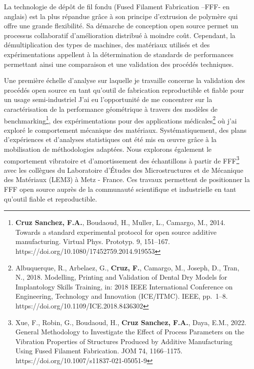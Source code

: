 \documentclass[
  11pt,
]{article}
\begin{document}
La technologie de dépôt de fil fondu (Fused Filament Fabrication --FFF-
en anglais) est la plus répandue grâce à son principe d'extrusion de
polymère qui offre une grande flexibilité. Sa démarche de conception
open source permet un processus collaboratif d'amélioration distribué à
moindre coût. Cependant, la démultiplication des types de machines, des
matériaux utilisés et des expérimentations appellent à la détermination
de standards de performances permettant ainsi une comparaison et une
validation des procédés techniques.

Une première échelle d'analyse sur laquelle je travaille concerne la
validation des procédés open source en tant qu'outil de fabrication
reproductible et fiable pour un usage semi-industriel J'ai eu
l'opportunité de me concentrer sur la caractérisation de la performance
géométrique à travers des modèles de benchmarking\footnote{\textbf{Cruz
  Sanchez, F.A.}, Boudaoud, H., Muller, L., Camargo, M., 2014. Towards a
  standard experimental protocol for open source additive manufacturing.
  Virtual Phys. Prototyp. 9, 151--167.
  https://doi.org/10.1080/17452759.2014.919553}, des expérimentations
pour des applications médicales\footnote{Albuquerque, R., Arbelaez, G.,
  \textbf{Cruz, F.}, Camargo, M., Joseph, D., Tran, N., 2018. Modelling,
  Printing and Validation of Dental Dry Models for Implantology Skills
  Training, in: 2018 IEEE International Conference on Engineering,
  Technology and Innovation (ICE/ITMC). IEEE, pp.~1--8.
  https://doi.org/10.1109/ICE.2018.8436302} où j'ai exploré le
comportement mécanique des matériaux. Systématiquement, des plans
d'expériences et d'analyses statistiques ont été mis en œuvre grâce à la
mobilisation de méthodologies adaptées. Nous explorons également le
comportement vibratoire et d'amortissement des échantillons à partir de
FFF\footnote{Xue, F., Robin, G., Boudaoud, H., \textbf{Cruz Sanchez,
  F.A.}, Daya, E.M., 2022. General Methodology to Investigate the Effect
  of Process Parameters on the Vibration Properties of Structures
  Produced by Additive Manufacturing Using Fused Filament Fabrication.
  JOM 74, 1166--1175. https://doi.org/10.1007/s11837-021-05051-9} avec
les collègues du Laboratoire d'Études des Microstructures et de
Mécanique des Matériaux (LEM3) à Metz - France. Ces travaux permettent
de positionner la FFF open source auprès de la communauté scientifique
et industrielle en tant qu'outil fiable et reproductible.
\end{document}
